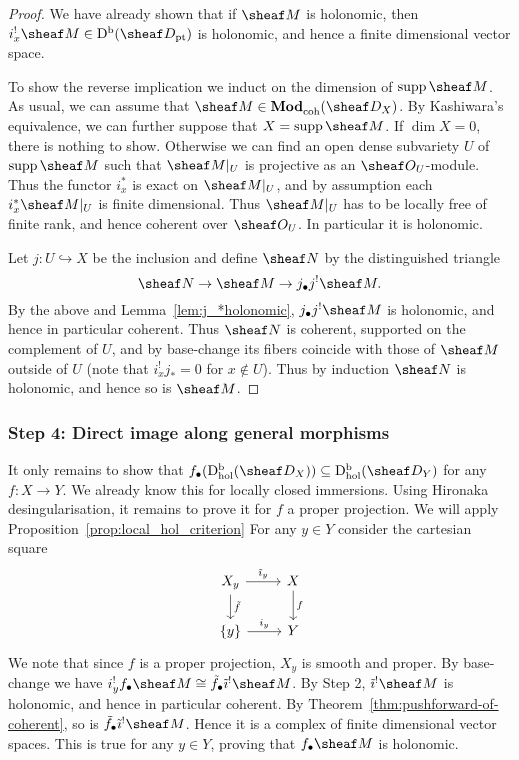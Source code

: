 \documentclass[number-in-sections,a4paper]{notes}
\begin{document}
\begin{proof}
    We have already shown that if $\sheaf M$ is holonomic, then $i_x^!\sheaf M \in \catDbDMod{\pt}$ is holonomic, and hence a finite dimensional vector space.

    To show the reverse implication we induct on the dimension of $\supp \sheaf M$.
    As usual, we can assume that $\sheaf M \in \catDModcoh{X}$.
    By Kashiwara's equivalence, we can further suppose that $X = \supp\sheaf M$.
    If $\dim X = 0$, there is nothing to show.
    Otherwise we can find an open dense subvariety $U$ of $\supp\sheaf M$ such that $\res{\sheaf M}U$ is projective as an $\sO_U$-module.
    Thus the functor $i_x^*$ is exact on $\res{\sheaf M}U$, and by assumption each $i_x^*\res{\sheaf M}{U}$ is finite dimensional.
    Thus $\res{\sheaf M}{U}$ has to be locally free of finite rank, and hence coherent over $\sO_U$.
    In particular it is holonomic.

    Let $j\colon U \hookrightarrow X$ be the inclusion and define $\sheaf N$ by the distinguished triangle
    \[
        \sheaf N \to \sheaf M \to j_\bullet j^!\sheaf M.
    \]
    By the above and Lemma~\ref{lem:j_*holonomic}, $j_\bullet j^!\sheaf M$ is holonomic, and hence in particular coherent.
    Thus $\sheaf N$ is coherent, supported on the complement of $U$, and by base-change its fibers coincide with those of $\sheaf M$ outside of $U$ (note that $i_x^!j_* = 0$ for $x \notin U$).
    Thus by induction $\sheaf N$ is holonomic, and hence so is $\sheaf M$.
\end{proof}

\subsubsection{Step 4: Direct image along general morphisms}

It only remains to show that $f_\bullet(\catDbDModhol{X}) \subseteq \catDbDModhol{Y}$ for any $f\colon X \to Y$.
We already know this for locally closed immersions.
Using Hironaka desingularisation, it remains to prove it for $f$ a proper projection.
We will apply Proposition~\ref{prop:local_hol_criterion}
For any $y \in Y$ consider the cartesian square
\[
    \begin{tikzcd}
        X_y \arrow[r, "\tilde\imath_y" ] \arrow[d, "\tilde f"] & X \arrow[d, "f"] \\
        \{y\} \arrow[r, "i_y"] & Y
    \end{tikzcd}
\]
We note that since $f$ is a proper projection, $X_y$ is smooth and proper.
By base-change we have $i_y^!f_\bullet \sheaf M \cong \tilde f_\bullet \tilde \imath^! \sheaf M$.
By Step 2, $\tilde \imath^! \sheaf M$ is holonomic, and hence in particular coherent.
By Theorem~\ref{thm:pushforward-of-coherent}, so is $\tilde f_\bullet \tilde \imath^! \sheaf M$.
Hence it is a complex of finite dimensional vector spaces.
This is true for any $y \in Y$, proving that $f_\bullet \sheaf M$ is holonomic.
\end{document}
